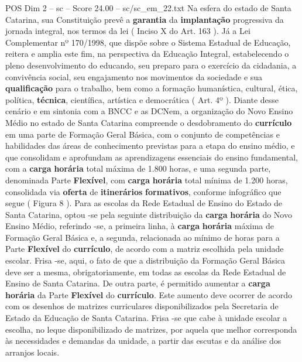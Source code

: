 \begin{textsample}{POS Dim 2 – sc – Score 24.00 – sc/sc\_em\_22.txt}
Na esfera do estado de Santa Catarina, sua Constituição prevê a \textbf{garantia} da \textbf{implantação} progressiva da jornada integral, nos termos da lei ( Inciso X do Art. 163 ).
Já a Lei Complementar nº 170/1998, que dispõe sobre o Sistema Estadual de Educação, reitera e amplia este fim, na perspectiva da Educação Integral, estabelecendo o pleno desenvolvimento do educando, seu preparo para o exercício da cidadania, a convivência social, seu engajamento nos movimentos da sociedade e sua \textbf{qualificação} para o trabalho, bem como a formação humanística, cultural, ética, política, \textbf{técnica}, científica, artística e democrática ( Art. 4º ).
Diante desse cenário e em sintonia com a BNCC e as DCNem, a organização do Novo Ensino Médio no estado de Santa Catarina compreende o desdobramento do \textbf{currículo} em uma parte de Formação Geral Básica, com o conjunto de competências e habilidades das áreas de conhecimento previstas para a etapa do ensino médio, e que consolidam e aprofundam as aprendizagens essenciais do ensino fundamental, com a \textbf{carga} \textbf{horária} total máxima de 1.800 horas, e uma segunda parte, denominada Parte \textbf{Flexível}, com \textbf{carga} \textbf{horária} total mínima de 1.200 horas, consolidada via \textbf{oferta} de \textbf{itinerários} \textbf{formativos}, conforme infográfico que segue ( Figura 8 ).
Para as escolas da Rede Estadual de Ensino do Estado de Santa Catarina, optou -se pela seguinte distribuição da \textbf{carga} \textbf{horária} do Novo Ensino Médio, referindo -se, a primeira linha, à \textbf{carga} \textbf{horária} máxima de Formação Geral Básica e, a segunda, relacionada ao mínimo de horas para a Parte \textbf{Flexível} do \textbf{currículo}, de acordo com a matriz escolhida pela unidade escolar.
Frisa -se, aqui, o fato de que a distribuição da Formação Geral Básica deve ser a mesma, obrigatoriamente, em todas as escolas da Rede Estadual de Ensino de Santa Catarina.
De outra parte, é permitido aumentar a \textbf{carga} \textbf{horária} da Parte \textbf{Flexível} do \textbf{currículo}.
Este aumento deve ocorrer de acordo com os desenhos de matrizes curriculares disponibilizados pela Secretaria de Estado da Educação de Santa Catarina.
Frisa -se que cabe à unidade escolar a escolha, no leque disponibilizado de matrizes, por aquela que melhor corresponda às necessidades e demandas da unidade, a partir das escutas e da análise dos arranjos locais.

\end{textsample}
